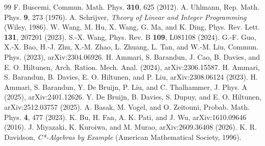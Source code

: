 \documentclass[11pt]{article}
\theoremstyle{definition}
\theoremstyle{remark}
\begin{document}
{\begin{thebibliography}{99}
 F. Buscemi, Commun. Math. Phys. \textbf{310}, 625 (2012).
 A. Uhlmann, Rep. Math. Phys. \textbf{9}, 273 (1976).
 A. Schrijver, \emph{Theory of Linear and Integer Programming} (Wiley, 1986).
 W. Wang, M. Hu, X. Wang, G. Ma, and K. Ding, Phys. Rev. Lett. \textbf{131}, 207201 (2023).
 S.-X. Wang, Phys. Rev. B \textbf{109}, L081108 (2024).
 G.-F. Guo, X.-X. Bao, H.-J. Zhu, X.-M. Zhao, L. Zhuang, L. Tan, and W.-M. Liu, Commun. Phys. (2023), arXiv:2304.06926.
 H. Ammari, S. Barandun, J. Cao, B. Davies, and E. O. Hiltunen, Arch. Ration. Mech. Anal. (2024), arXiv:2306.15587.
 H. Ammari, S. Barandun, B. Davies, E. O. Hiltunen, and P. Liu, arXiv:2308.06124 (2023).
 H. Ammari, S. Barandun, Y. De Bruijn, P. Liu, and C. Thalhammer, J. Phys. A (2025), arXiv:2401.12626.
 Y. De Bruijn, B. Davies, S. Dupuy, and E. O. Hiltunen, arXiv:2512.03757 (2025).
 A. Basak, M. Vogel, and O. Zeitouni, Probab. Math. Phys. \textbf{4}, 477 (2023).
 K. Bu, H. Fan, A. K. Pati, and J. Wu, arXiv:1610.09646 (2016).
 J. Miyazaki, K. Kuroiwa, and M. Murao, arXiv:2609.36408 (2026).
 K. R. Davidson, \emph{C*-Algebras by Example} (American Mathematical Society, 1996).
\end{thebibliography}
}
\end{document}
